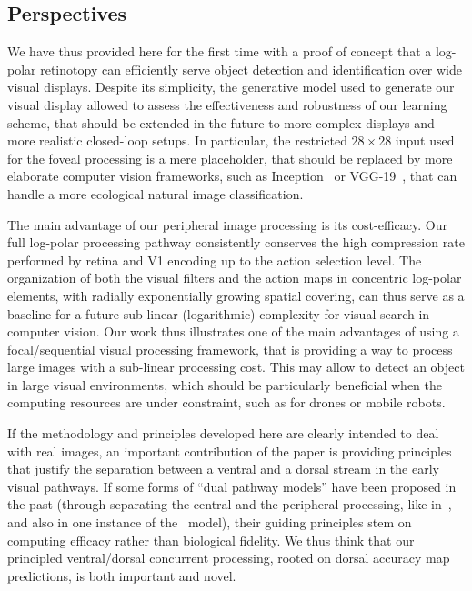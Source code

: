 \subsection{Perspectives}
%
We have thus provided here for the first time with a proof of concept that a log-polar retinotopy can efficiently serve object detection and identification over wide visual displays. Despite its simplicity, the generative model used to generate our visual display allowed to assess the effectiveness and robustness of our learning scheme, that should be extended in the future to more complex displays and more realistic closed-loop setups. In particular, the restricted $28\times28$ input used for the foveal processing is a mere placeholder, that should be replaced by more elaborate computer vision frameworks, such as Inception~\cite{szegedy2015going} or VGG-19~\cite{simonyan2014very}, that can handle a more ecological natural image classification.

The main advantage of our peripheral image processing is its cost-efficacy. Our full log-polar processing pathway consistently conserves the high compression rate performed by retina and V1 encoding up to the action selection level. The organization of both the visual filters and the action maps in concentric log-polar elements, with radially exponentially growing spatial covering, can thus serve as a baseline for a future sub-linear (logarithmic) complexity for visual search in computer vision. Our work thus illustrates one of the main advantages of using a focal/sequential visual processing framework, that is providing a way to process large images with a sub-linear processing cost. This may allow to detect an object in large visual environments, which should be particularly beneficial when the computing resources are under constraint, such as for drones or mobile robots.

If the methodology and principles developed here are clearly intended to deal with real images, an important contribution of the paper is providing principles that justify the separation between a ventral and a dorsal stream in the early visual pathways. If some forms of ``dual pathway models'' have been proposed in the past (through separating the central and the peripheral processing, like in~\cite{denil2012learning}, and also in one instance of the~\cite{akbas2017object} model), their guiding principles stem on computing efficacy rather than biological fidelity. We thus think that our principled ventral/dorsal concurrent processing, rooted on dorsal accuracy map predictions, is both important and novel.

